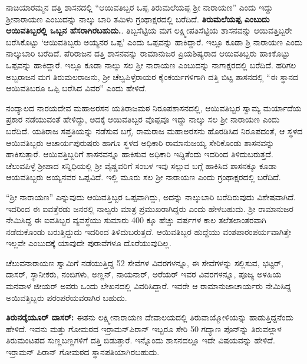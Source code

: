 ನಾಚಿಯಾರಮ್ಮನ ದತ್ತಿ ಶಾಸನದಲ್ಲಿ “ಆಯಿವತಿಬ್ಬರ ಒಪ್ಪ ತಿರುಮಲೆಯಪ್ಪ ಶ‍್ರೀ ನಾರಾಯಣ” ಎಂದು ಇದ್ದು ಶ‍್ರೀನಾರಾಯಣ ಎಂಬುದನ್ನು ನಾಲ್ಕು ಬಾರಿ ತಮಿಳು ಗ್ರಂಥಾಕ್ಷರದಲ್ಲಿ ಬರೆದಿದೆ. \textbf{ತಿರುಮಲೆಯಪ್ಪ ಎಂಬುದು ಆಯಿವತಿಬ್ಬರಲ್ಲಿ ಒಬ್ಬನ ಹೆಸರಾಗಿರಬಹುದು.}. ತಿಬ್ಬಸೆಟ್ಟಿಯ ಮಗ ಲಕ್ಷ್ಮೀಪತಿಸೆಟ್ಟಿಯ ಶಾಸನವನ್ನು ಆಯಿವತ್ತಿಬ್ಬರೇ ಬರೆಸಿಕೊಟ್ಟು ‘ಆಯಿವತಿಬ್ಬರು ಅಯ್ಯನರ ಒಪ್ಪ’ ಎಂದು ಒಪ್ಪವನ್ನು ಹಾಕಿದ್ದಾರೆ. ಇಲ್ಲೂ ಕೂಡಾ ಶ್ರಿ ನಾರಾಯಣ ಎಂದು ನಾಲ್ಕುಬಾರಿ ಬರೆದಿದೆ. ಪೆರಿರಾಜನ ದತ್ತಿ ಶಾಸನವನ್ನು ರಾಮಾನುಜರ ಪ್ರಿಯಶಿಷ್ಯರಾದ ಆಯಿವತಿಬ್ಬರು ಹಾಕಿಕೊಟ್ಟು ಒಪ್ಪವನ್ನು ಹಾಕಿದ್ದಾರೆ. ಇಲ್ಲೂ ಕೂಡಾ ನಾಲ್ಕು ಸಲ ಶ‍್ರೀ ನಾರಾಯಣ ಎಂಬುದನ್ನು ನಾಗಾಕ್ಷರದಲ್ಲಿ ಬರೆದಿದೆ. ಹರಿಗಲ ಅಬ್ಬರಾಜನ ಮಗ ತಿರುಮಲರಾಜನು, ಶ‍್ರೀ ಚೆಲ್ವಪಿಳ್ಳೆರಾಯರ ಕೈಂಕರ್ಯಗಳಿಗಾಗಿ ದತ್ತಿ ಬಿಟ್ಟ ಶಾಸನದಲ್ಲಿ “ಈ ಸ್ಥಾನದ ಆಯಿವತಿಬರೂ ಒಪ್ಪಿ ಬರೆಸಿದ ವಿವರ” ಎಂದು ಹೇಳಿದೆ.

ನಂದ್ಯಾಲದ ನಾರಯದೇವ ಮಹಾಅರಸನ ಯತಿರಾಜಮಠ ನಿರೂಪಶಾಸನದಲ್ಲಿ, ಆಯಿವತಿಬ್ಬರ ಸ್ವಾಮ್ಯ ಮರ್ಯಾದೆಯ ಪ್ರಕಾರ ನಡೆಯುವಂತೆ ಹೇಳಿದ್ದು, ಅದಕ್ಕೆ ಆಯಿವತಿಬ್ಬರ ವೊಪ್ಪವೂ ಇದ್ದು ನಾಲ್ಕು ಸಲ ಶ‍್ರೀ ನಾರಾಯಣ ಎಂದು ಬರೆದಿದೆ. ಯತಿರಾಜ ಸಪ್ತತಿಯನ್ನು ನಡೆಸುವ ಬಗ್ಗೆ, ರಾಮರಾಜ ಮಹಾಅರಸನು ಹೊರಡಿಸಿದ ನಿರೂಪದಂತೆ, ಆ ಸ್ಥಳದ ಆಯಿವತಿಬ್ಬರು ಆಚಾರ್ಯಪುರುಷರು ಹಾಗೂ ಸ್ಥಳದ ಅಧಿಕಾರಿ ರಾಮಾನುಜಯ್ಯ ಸೇರಿಕೊಂಡು ಶಾಸನವನ್ನು ಹಾಕಿಸುತ್ತಾರೆ. ಆಯಿವತ್ತಿಬ್ಬರಿಗೆ ಶಾಸನವನ್ನೂ ಹಾಕಿಸುವ ಅಧಿಕಾರಿ ಇದ್ದಿತೆಂದು ಇದರಿಂದ ತಿಳಿದುಬರುತ್ತದೆ. ಚೆಲುವಪಿಳ್ಳೆ ಶ‍್ರೀಪಾದ ಸನ್ನಿಧಿಯಲ್ಲಿ ಶ‍್ರೀ ವೈಷ್ಣವರಿಗೆ ಸಂಬಳ ಇವು ಸಲ್ಲುವ ಬಗ್ಗೆ ಹಾಕಿಸಿದ ಶಾಸನಕ್ಕೂ ಕೂಡಾ ಆಯವತಿಬ್ಬರು ಅಯ್ಯನವರ ಒಪ್ಪವಿದೆ. ಇಲ್ಲಿ ಮೂರು ಸಲ ಶ‍್ರೀ ನಾರಾಯಣ ಎಂದು ಗ್ರಂಥಾಕ್ಷರದಲ್ಲಿ ಬರೆದಿದೆ.

“ಶ‍್ರೀ ನಾರಾಯಣ” ಎನ್ನುವುದು ಆಯಿವತ್ತಿಬ್ಬರ ಒಪ್ಪವಾಗಿದ್ದು, ಅದನ್ನು ನಾಲ್ಕುಬಾರಿ ಬರೆದಿರುವುದು ವಿಶೇಷವಾಗಿದೆ. ಇದರಿಂದ ಈ ಐವತ್ತೆರಡು ಜನರಲ್ಲಿ ನಾಲ್ವರು ಮಾತ್ರ ಪ್ರಮುಖರಾಗಿದ್ದರು ಎಂದು ಹೇಳಬಹುದು. ಶ‍್ರೀ ರಾಮಾನುಜರ ನೇಮಿಸಿದ್ದ ಈ ಐವತಿಬ್ಬರ ವ್ಯವಸ್ಥೆಯು ಸುಮಾರು 400 ಕ್ಕೂ ಹೆಚ್ಚು ವರ್ಷಗಳ ಕಾಲ ತಲೆತಲಾಂತರವಾಗಿ ನಡೆದುಕೊಂಡು ಬರುತ್ತಿದ್ದುದು ಇದರಿಂದ ತಿಳಿದುಬರುತ್ತದೆ. ಆಯಿವತಿಬ್ಬರ ಹುದ್ದೆಯು ವಂಶಪಾರಂಪರ್ಯವಾಗಿತ್ತೇ ಇಲ್ಲವೇ ಎಂಬುದಕ್ಕೆ ಯಾವುದೇ ಪುರಾವೆಗಳೂ ದೊರೆಯುವುದಿಲ್ಲ.

ಚೆಲುವನಾರಾಯಣ ಸ್ವಾಮಿಗೆ ನಡೆಯುತ್ತಿದ್ದ 52 ಸೇವೆಗಳ ವಿವರಗಳನ್ನೂ, ಈ ಸೇವೆಗಳನ್ನು ಸಲ್ಲಿಸುವ, ಭಟ್ಟರ್​, ದಾಸರ್​, ಸ್ಥಾನೀಕರು, ನಂಬಿಗಳು, ಅಣ್ಣನ್​, ನಾಯನಾರ್​, ಅರೆಯರ್​ ಇವರ ವಿವರಗಳನ್ನೂ, ಪೂಜ್ಯ ಅಳಹಿಯ ಮನವಾಳ ಜೀಯರ್​ ಅವರು ಒಂದು ಲೇಖನದಲ್ಲಿ ವಿವರಿಸಿದ್ದಾರೆ. ಇವರೇ ಆ ರಾಮಾನುಜಾಚಾರ್ಯರು ನೇಮಿಸಿದ್ದ ಅಯಿವತ್ತಿಬ್ಬರು ಪರಂಪರೆಯವರಾಗಿರ ಬಹುದು.

\textbf{ತಿರುನರೈಯೂರ್​ ದಾಸರ್​:} ಈತನು ಲಕ್ಷ್ಮೀನಾರಾಯಣ ದೇವಾಲಯದಲ್ಲಿ ತಿರುವಾಯ್ಮೋಳಿಯನ್ನು ಹಾಡುತ್ತಿದ್ದನೆಂದು ಹೇಳಿದೆ. ಇವನು ಮತ್ತು ಗೋಮಠದ ಇರ್ರಾಮನ್​ಪಿರಾನ್​ ಇಬ್ಬರೂ ಸೇರಿ 50 ಗದ್ಯಾಣ ಪೊನ್​ನ್ನು ತಿರುವಲ್ಲಾಳ ತಿರುಮಂಟಪದ ಸುಣ್ಣಬಣ್ಣಗಳಿಗೆ ದತ್ತಿ ಬಿಡುತ್ತಾರೆ. ಇನ್ನೊಂದು ಶಾಸನದಲ್ಲೂ ಇದೇ ವಿಷಯವನ್ನು ಹೇಳಿದೆ. ಇರ್ರಾಮನ್​ ಪಿರಾನ್​ ಗೋಮಠದ ಸ್ಥಾನಪತಿಯಾಗಿರಬಹುದು.

